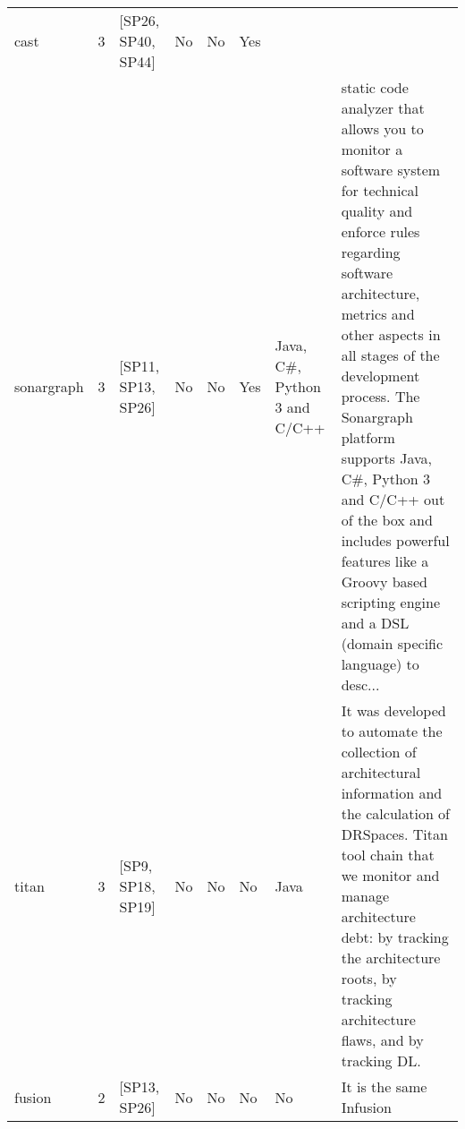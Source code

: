 \begin{tabular}{lrllllll}
                cast &      3 &                                     [SP26, SP40, SP44] &    No &       No &       Yes &                                                                                                                                                                                         &                                                                                                                                                                                                                                                                                                                                                                                                                  \\
          sonargraph &      3 &                                     [SP11, SP13, SP26] &    No &       No &       Yes &                                                                                                                                                            Java, C\#, Python 3 and C/C++ &  static code analyzer that allows you to monitor a software system for technical quality and enforce rules regarding software architecture, metrics and other aspects in all stages of the development process. The Sonargraph platform supports Java, C\#, Python 3 and C/C++ out of the box and includes powerful features like a Groovy based scripting engine and a DSL (domain specific language) to desc... \\
               titan &      3 &                                      [SP9, SP18, SP19] &    No &       No &        No &                                                                                                                                                                                    Java &                                                                                                                                                 It was developed to automate the collection of architectural information and the calculation of DRSpaces. Titan tool chain that we monitor and manage architecture debt: by tracking the architecture roots, by tracking architecture flaws, and by tracking DL. \\
              fusion &      2 &                                           [SP13, SP26] &    No &       No &        No &                                                                                                                                                                                      No &                                                                                                                                                                                                                                                                                                                                                                                          It is the same Infusion \\

\end{tabular}
